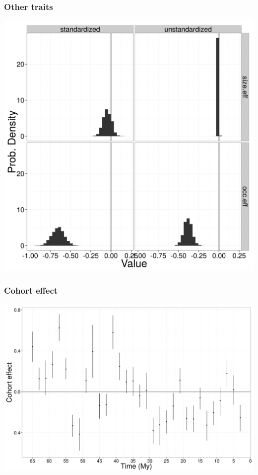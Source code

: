 \documentclass{beamer}
\begin{document}
\begin{frame}
  \frametitle{Other traits}
  \begin{center}
    \includegraphics[height = 0.8\textheight, width = \textwidth,  keepaspectratio = true]{figure/other_est}
  \end{center}
\end{frame}

\begin{frame}
  \frametitle{Cohort effect}
  \begin{center}
    \includegraphics[height = 0.8\textheight, width = \textwidth,  keepaspectratio = true]{figure/cohort_est}
  \end{center}
\end{frame}
\end{document}
